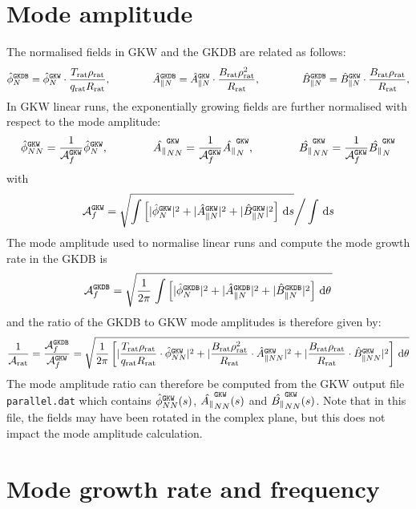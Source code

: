 \documentclass[a4paper]{report}
\begin{document}
\section{Mode amplitude}
The normalised fields in GKW and the GKDB are related as follows:
\begin{equation}
\hat{\phi}_N^{\texttt{GKDB}} = \hat{\phi}_N^{\texttt{GKW}}\cdot\frac{T_\textrm{rat}\rho_\textrm{rat}}{q_\textrm{rat}R_\textrm{rat}}, \qquad \qquad
\hat{A}_{\parallel N}^{\texttt{GKDB}} = \hat{A}_{\parallel N}^{\texttt{GKW}}\cdot\frac{B_\textrm{rat}\rho_\textrm{rat}^2}{R_\textrm{rat}}, \qquad \qquad 
\hat{B}_{\parallel N}^{\texttt{GKDB}} = \hat{B}_{\parallel N}^{\texttt{GKW}}\cdot\frac{B_\textrm{rat}\rho_\textrm{rat}}{R_\textrm{rat}},  
\end{equation}
In GKW linear runs, the exponentially growing fields are further normalised with respect to the mode amplitude:
\begin{equation}
\hat{\phi}_{NN}^{\texttt{GKW}} = \frac{1}{\mathcal{A}_f^{\texttt{GKW}}}\hat{\phi}_N^{\texttt{GKW}},  \qquad \qquad \hat{A_\parallel}_{NN}^{\texttt{GKW}} = \frac{1}{\mathcal{A}_f^{\texttt{GKW}}}\hat{A_\parallel}_N^{\texttt{GKW}},  \qquad \qquad \hat{B_\parallel}_{NN}^{\texttt{GKW}} = \frac{1}{\mathcal{A}_f^{\texttt{GKW}}}\hat{B_\parallel}_N^{\texttt{GKW}}
\end{equation}
with
\begin{equation}
\mathcal{A}_f^{\texttt{GKW}} = \sqrt{\int \left[|\hat{\phi}_N^{\texttt{GKW}}|^2 + |\hat{A}_{\parallel N}^{\texttt{GKW}}|^2+|\hat{B}_{\parallel N}^{\texttt{GKW}}|^2\right] \,\textrm{d}s} \bigg/ \int \,\textrm{d}s
\end{equation}
The mode amplitude used to normalise linear runs and compute the mode growth rate in the GKDB is 
\begin{equation}
\mathcal{A}_f^{\texttt{GKDB}}  = \sqrt{\frac{1}{2\pi}\left.\int \left[|\hat{\phi}_N^{\texttt{GKDB}}|^2 + |\hat{A}_{\parallel N}^{\texttt{GKDB}}|^2  + |\hat{B}_{\parallel N}^{\texttt{GKDB}}|^2\right] \,\textrm{d}\theta \right.}
\end{equation}
and the ratio of the GKDB to GKW mode amplitudes is therefore given by:
\begin{equation}
\frac{1}{\mathcal{A}_\textrm{rat}} = \frac{\mathcal{A}_f^{\texttt{GKDB}}}{\mathcal{A}_f^{\texttt{GKW}}} = \sqrt{\frac{1}{2\pi}\left[ |\frac{T_\textrm{rat}\rho_\textrm{rat}}{q_\textrm{rat}R_\textrm{rat}}\cdot\hat{\phi}_{NN}^{\texttt{GKW}}|^2 + |\frac{B_\textrm{rat}\rho_\textrm{rat}^2}{R_\textrm{rat}}\cdot\hat{A}_{\parallel NN}^{\texttt{GKW}}|^2+|\frac{B_\textrm{rat}\rho_\textrm{rat}}{R_\textrm{rat}}\cdot\hat{B}_{\parallel NN}^{\texttt{GKW}}|^2\right]\,\textrm{d}\theta }
\end{equation}
The mode amplitude ratio can therefore be computed from the GKW output file \texttt{parallel.dat} which contains $\hat{\phi}_{NN}^{\texttt{GKW}}(s)$, $\hat{A_\parallel}_{NN}^{\texttt{GKW}}(s)$ and $\hat{B_\parallel}_{NN}^{\texttt{GKW}}(s)$. Note that in this file, the fields may have been rotated in the complex plane, but this does not impact the mode amplitude calculation.

\section{Mode growth rate and frequency}




\end{document}

